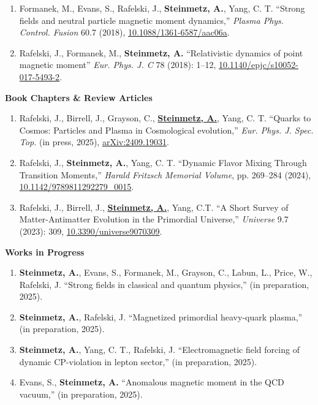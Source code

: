 \documentclass[11pt]{article}
\begin{document}
\begin{enumerate}[leftmargin=*,nosep]
    \item Formanek, M., Evans, S., Rafelski, J., \textbf{Steinmetz, A.}, Yang, C. T. ``Strong fields and neutral particle magnetic moment dynamics,'' \textit{Plasma Phys. Control. Fusion} 60.7 (2018), \href{https://doi.org/10.1088/1361-6587/aac06a}{10.1088/1361-6587/aac06a}.
    \item Rafelski, J., Formanek, M., \textbf{Steinmetz, A.} ``Relativistic dynamics of point magnetic moment'' \textit{Eur. Phys. J. C} 78 (2018): 1--12, \href{https://doi.org/10.1140/epjc/s10052-017-5493-2}{10.1140/epjc/s10052-017-5493-2}.
\end{enumerate}

\medskip

{\large\textbf{Book Chapters \& Review Articles}}

\begin{enumerate}[leftmargin=*,nosep]
    \item Rafelski, J., Birrell, J., Grayson, C., \textbf{\href{https://github.com/ajsteinmetz/thesis-collab-project}{Steinmetz, A.}}, Yang, C. T. ``Quarks to Cosmos: Particles and Plasma in Cosmological evolution,'' \textit{Eur. Phys. J. Spec. Top.} (in press, 2025), \href{https://doi.org/10.48550/arXiv.2409.19031}{arXiv:2409.19031}.
    \item Rafelski, J., \textbf{Steinmetz, A.}, Yang, C. T. ``Dynamic Flavor Mixing Through Transition Moments,'' \textit{Harald Fritzsch Memorial Volume}, pp. 269--284 (2024), \href{https://doi.org/10.1142/9789811292279_0015}{10.1142/9789811292279\_0015}.
    \item Rafelski, J., Birrell, J., \textbf{\href{https://github.com/ajsteinmetz/a-short-survey}{Steinmetz, A.}}, Yang, C.T. ``A Short Survey of Matter-Antimatter Evolution in the Primordial Universe,'' \textit{Universe} 9.7 (2023): 309, \href{https://doi.org/10.3390/universe9070309}{10.3390/universe9070309}.
\end{enumerate}

\medskip

{\large\textbf{Works in Progress}}

\begin{enumerate}[leftmargin=*,nosep]
    \item \textbf{Steinmetz, A.}, Evans, S., Formanek, M., Grayson, C., Labun, L., Price, W., Rafelski, J. ``Strong fields in classical and quantum physics,'' (in preparation, 2025).
    \item \textbf{Steinmetz, A.}, Rafelski, J. ``Magnetized primordial heavy-quark plasma,'' (in preparation, 2025).
    \item \textbf{Steinmetz, A.}, Yang, C. T., Rafelski, J. ``Electromagnetic field forcing of dynamic CP-violation in lepton sector,'' (in preparation, 2025).
    \item Evans, S., \textbf{Steinmetz, A.} ``Anomalous magnetic moment in the QCD vacuum,'' (in preparation, 2025).
\end{enumerate}
\end{document}
